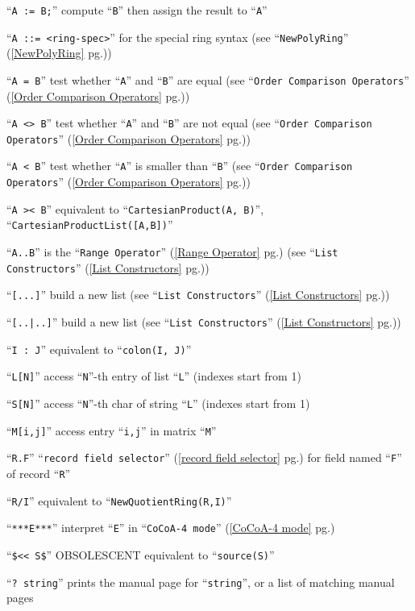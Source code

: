 \documentclass[a4paper]{mybook}
\newenvironment{command}{}{} %
\begin{document}
\begin{command}
``\verb&A := B;&'' compute ``\verb&B&'' then assign the result to ``\verb&A&''
\par 
``\verb&A ::= <ring-spec>&''  for the special ring syntax (see ``\verb&NewPolyRing&'' (\ref{NewPolyRing} pg.\pageref{NewPolyRing}))
\par 
``\verb&A = B&''   test whether ``\verb&A&'' and ``\verb&B&'' are equal (see ``\verb&Order Comparison Operators&'' (\ref{Order Comparison Operators} pg.\pageref{Order Comparison Operators}))
\par 
``\verb&A <> B&''  test whether ``\verb&A&'' and ``\verb&B&'' are not equal (see ``\verb&Order Comparison Operators&'' (\ref{Order Comparison Operators} pg.\pageref{Order Comparison Operators}))
\par 
``\verb&A < B&''  test whether ``\verb&A&'' is smaller than ``\verb&B&'' (see ``\verb&Order Comparison Operators&'' (\ref{Order Comparison Operators} pg.\pageref{Order Comparison Operators}))
\par 
``\verb&A >< B&''  equivalent to ``\verb&CartesianProduct(A, B)&'', ``\verb&CartesianProductList([A,B])&''
\par 
``\verb&A..B&''    is the ``\verb&Range Operator&'' (\ref{Range Operator} pg.\pageref{Range Operator}) (see ``\verb&List Constructors&'' (\ref{List Constructors} pg.\pageref{List Constructors}))
\par 
``\verb&[...]&''   build a new list (see ``\verb&List Constructors&'' (\ref{List Constructors} pg.\pageref{List Constructors}))
\par 
``\verb&[..|..]&'' build a new list (see ``\verb&List Constructors&'' (\ref{List Constructors} pg.\pageref{List Constructors}))
\par 
``\verb&I : J&''   equivalent to ``\verb&colon(I, J)&''
\par 
``\verb&L[N]&''    access ``\verb&N&''-th entry of list ``\verb&L&'' (indexes start from 1)
\par 
``\verb&S[N]&''    access ``\verb&N&''-th char of string ``\verb&L&'' (indexes start from 1)
\par 
``\verb&M[i,j]&''  access entry ``\verb&i,j&'' in matrix ``\verb&M&''
\par 
``\verb&R.F&''     ``\verb&record field selector&'' (\ref{record field selector} pg.\pageref{record field selector}) for field named ``\verb&F&'' of record ``\verb&R&''
\par 
``\verb&R/I&''     equivalent to ``\verb&NewQuotientRing(R,I)&''
\par 
``\verb&***E***&'' interpret ``\verb&E&'' in ``\verb&CoCoA-4 mode&'' (\ref{CoCoA-4 mode} pg.\pageref{CoCoA-4 mode})
\par 
``\verb&$<< S$&''  OBSOLESCENT equivalent to ``\verb&source(S)&''
\par 
``\verb&? string&'' prints the manual page for ``\verb&string&'', or a list of matching manual pages


\end{command}
\end{document}
